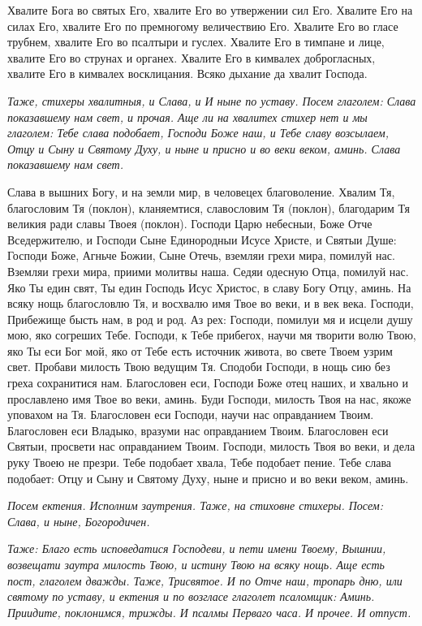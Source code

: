 Хвалите Бога во святых Его, хвалите Его во утвержении сил Его. Хвалите Его на силах Его, хвалите Его по премногому величествию Его. Хвалите Его во гласе трубнем, хвалите Его во псалтыри и гуслех. Хвалите Его в тимпане и лице, хвалите Его во струнах и органех. Хвалите Его в кимвалех доброгласных, хвалите Его в кимвалех восклицания. Всяко дыхание да хвалит Господа.


\itshape Таже, стихеры хвалитныя, и Слава, и И ныне по уставу. Посем глаголем:\normalfont{} Слава показавшему нам свет, и прочая. Аще ли на хвалитех стихер нет и мы глаголем: Тебе слава подобает, Господи Боже наш, и Тебе славу возсылаем, Отцу и Сыну и Святому Духу, и ныне и присно и во веки веком, аминь. Слава показавшему нам свет. 

Слава в вышних Богу, и на земли мир, в человецех благоволение. Хвалим Тя, благословим Тя (поклон), кланяемтися, славословим Тя (поклон), благодарим Тя великия ради славы Твоея (поклон). Господи Царю небесныи, Боже Отче Вседержителю, и Господи Сыне Единородныи Исусе Христе, и Святыи Душе: Господи Боже, Агньче Божии, Сыне Отечь, вземляи грехи мира, помилуй нас. Вземляи грехи мира, приими молитвы наша. Седяи одесную Отца, помилуй нас. Яко Ты един свят, Ты един Господь Исус Христос, в славу Богу Отцу, аминь. На всяку нощь благословлю Тя, и восхвалю имя Твое во веки, и в век века. Господи, Прибежище бысть нам, в род и род. Аз рех: Господи, помилуи мя и исцели душу мою, яко согреших Тебе. Господи, к Тебе прибегох, научи мя творити волю Твою, яко Ты еси Бог мой, яко от Тебе есть источник живота, во свете Твоем узрим свет. Пробави милость Твою ведущим Тя. Сподоби Господи, в нощь сию без греха сохранитися нам. Благословен еси, Господи Боже отец наших, и хвально и прославлено имя Твое во веки, аминь. Буди Господи, милость Твоя на нас, якоже уповахом на Тя. Благословен еси Господи, научи нас оправданием Твоим. Благословен еси Владыко, вразуми нас оправданием Твоим. Благословен еси Святыи, просвети нас оправданием Твоим. Господи, милость Твоя во веки, и дела руку Твоею не презри. Тебе подобает хвала, Тебе подобает пение. Тебе слава подобает: Отцу и Сыну и Святому Духу, ныне и присно и во веки веком, аминь.


\itshape Посем ектения.\normalfont{} Исполним заутрения. Таже, на стиховне стихеры. Посем: Слава, и ныне, Богородичен.


\itshape Таже:\normalfont{} Благо есть исповедатися Господеви, и пети имени Твоему, Вышнии, возвещати заутра милость Твою, и истину Твою на всяку нощь. Аще есть пост, глаголем дважды. Таже, Трисвятое. И по Отче наш, тропарь дню, или святому по уставу, и ектения и по возгласе глаголет псаломщик: Аминь. Приидите, поклонимся, трижды. И псалмы Перваго часа. И прочее. И отпуст.


